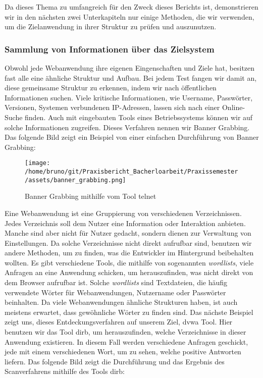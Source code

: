Da dieses Thema zu umfangreich für den Zweck dieses Berichts ist, demonstrieren wir in den nächsten zwei Unterkapiteln nur einige Methoden, die wir verwenden, um die Zielanwendung in ihrer Struktur zu prüfen und auszunutzen.

\subsubsection{Sammlung von Informationen über das Zielsystem}

Obwohl jede Webanwendung ihre eigenen Eingenschaften und Ziele hat, besitzen fast alle eine ähnliche Struktur und Aufbau. Bei jedem Test fangen wir damit an, diese gemeinsame Struktur zu erkennen, indem wir nach öffentlichen Informationen suchen. Viele kritische Informationen, wie Username, Passwörter, Versionen, Systemen verbundenen IP-Adressen, lassen sich nach einer Online-Suche finden. Auch mit eingebauten Tools eines Betriebssystems können wir auf solche Informationen zugreifen. Dieses Verfahren nennen wir Banner Grabbing. Das folgende Bild zeigt ein Beispiel von einer einfachen Durchführung von Banner Grabbing:

\begin{figure}[H]
    \centering
    \texttt{[image: /home/bruno/git/Praxisbericht\_Bacherloarbeit/Praxissemester/assets/banner\_grabbing.png]}
    \caption{Banner Grabbing mithilfe vom Tool telnet}
    \centering
\end{figure}

Eine Webanwendung ist eine Gruppierung von verschiedenen Verzeichnissen. Jedes Verzeichnis soll dem Nutzer eine Information oder Interaktion anbieten. Manche sind aber nicht für Nutzer gedacht, sondern dienen zur Verwaltung von Einstellungen. Da solche Verzeichnisse nicht direkt aufrufbar sind, benutzen wir andere Methoden, um zu finden, was die Entwickler im Hintergrund beibehalten wollten. Es gibt verschiedene Tools, die mithilfe von sogenannten \textit{wordlists}, viele Anfragen an eine Anwendung schicken, um herauszufinden, was nicht direkt von dem Browser aufrufbar ist. Solche \textit{wordlists} sind Textdateien, die häufig verwendete Wörter für Webanwendungen, Nutzername oder Passwörter beinhalten. Da viele Webanwendungen ähnliche Strukturen haben, ist auch meistens erwartet, dass gewöhnliche Wörter zu finden sind. Das nächste Beispiel zeigt uns, dieses Entdeckungsverfahren auf unserem Ziel, \gls{dvwa} Tool. Hier benutzen wir das Tool \gls{dirb}, um herauszufinden, welche Verzeichnisse in dieser Anwendung existieren. In diesem Fall werden verschiedene Anfragen geschickt, jede mit einem verschiedenen Wort, um zu sehen, welche positive Antworten liefern. Das folgende Bild zeigt die Durchführung und das Ergebnis des Scanverfahrens mithilfe des Tools \gls{dirb}:

